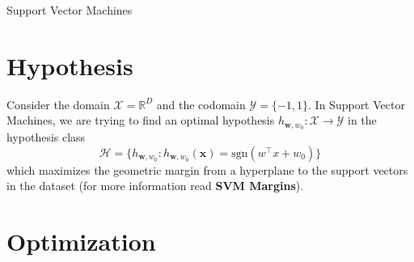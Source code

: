 \documentclass[12pt]{article}
\begin{document}
\begin{center}
	\LARGE{Support Vector Machines}
\end{center}

\section{Hypothesis}

Consider the domain $\mathcal{X} = \mathbb{R}^D$ and the codomain  $\mathcal{Y} = \{-1, 1\}$. In Support Vector Machines, we are trying to find an optimal hypothesis $h_{\mathbf{w},{w_0}} : \mathcal{X} \rightarrow \mathcal{Y}$ in the hypothesis class
\[ \mathcal{H} = \{ h_{\mathbf{w},w_0} : h_{\mathbf{w},w_0}(\mathbf{x}) = \text{sgn}(w^\top x + w_0) \} \]
which maximizes the geometric margin from a hyperplane to the support vectors in the dataset (for more information read \textbf{SVM Margins}).

\section{Optimization}
\end{document}
